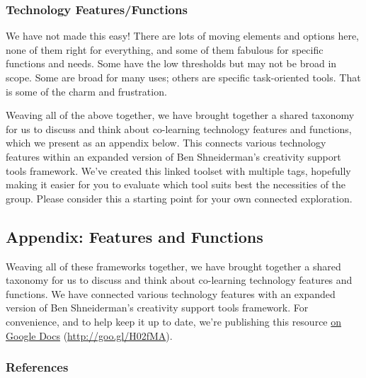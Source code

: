 \subsubsection{Technology Features/Functions}

We have not made this easy! There are lots of moving elements and
options here, none of them right for everything, and some of them
fabulous for specific functions and needs. Some have the low thresholds
but may not be broad in scope. Some are broad for many uses; others are
specific task-oriented tools. That is some of the charm and frustration.

Weaving all of the above together, we have brought together a shared
taxonomy for us to discuss and think about co-learning technology
features and functions, which we present as an appendix below. This
connects various technology features within an expanded version of Ben
Shneiderman's creativity support tools framework. We've created this
linked toolset with multiple tags, hopefully making it easier for you to
evaluate which tool suits best the necessities of the group. Please
consider this a starting point for your own connected exploration.

\subsection{Appendix: Features and Functions}

Weaving all of these frameworks together, we have brought together a
shared taxonomy for us to discuss and think about co-learning
technology features and functions.  We have connected various
technology features with an expanded version of Ben Shneiderman's
creativity support tools framework.  For convenience, and to help keep
it up to date, we're publishing this
resource \href{https://docs.google.com/spreadsheet/ccc?key=0ApZ8\_aXL9go8dEUxeThxblhQWmVPbHdHdWpaLWxOWGc\#gid=0}{on
Google Docs} (\url{http://goo.gl/H02fMA}).

\subsubsection{References}

